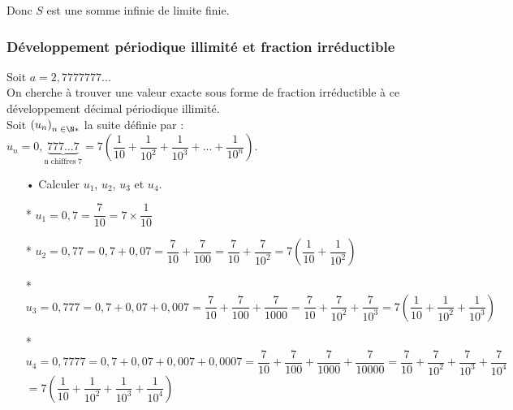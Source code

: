 Donc $S$ est une somme infinie de limite finie.

\subsubsection{Développement périodique illimité et fraction irréductible}

Soit $a = 2,7777777...$ \\

On cherche à trouver une valeur exacte sous forme de fraction irréductible à ce développement décimal périodique illimité. \\

Soit $\left(u_n\right)_{n \; \in \N*}$ la suite définie par : $u_n = 0, \! \! \! \underbrace{777...7}_{\mathrm{n \; chiffres \; 7}} = 7 \left(\dfrac{1}{10} + \dfrac{1}{10^2} + \dfrac{1}{10^3} + ... + \dfrac{1}{10^n}\right)$. \\

\begin{itemize}
\item[•] Calculer $u_1$, $u_2$, $u_3$ et $u_4$. \\
\end{itemize} 

\begin{itemize}
\item[*] $u_1 = 0,7 = \dfrac{7}{10} = 7 \times \dfrac{1}{10}$ \vspace*{.3cm} \\
\item[*] $u_2 = 0,77 = 0,7 + 0,07 = \dfrac{7}{10} + \dfrac{7}{100} = \dfrac{7}{10} + \dfrac{7}{10^2} = 7 \left(\dfrac{1}{10} + \dfrac{1}{10^2}\right)$ \vspace*{.3cm} \\
\item[*] $u_3 = 0,777 = 0,7 + 0,07 + 0,007 = \dfrac{7}{10} + \dfrac{7}{100} + \dfrac{7}{1000} = \dfrac{7}{10} + \dfrac{7}{10^2} + \dfrac{7}{10^3} = 7 \left(\dfrac{1}{10} + \dfrac{1}{10^2} + \dfrac{1}{10^3}\right)$ \vspace*{.3cm} \\
\item[*] $u_4 = 0,7777 = 0,7 + 0,07 + 0,007 + 0,0007 = \dfrac{7}{10} + \dfrac{7}{100} + \dfrac{7}{1000} + \dfrac{7}{10000} = \dfrac{7}{10} + \dfrac{7}{10^2} + \dfrac{7}{10^3} + \dfrac{7}{10^4}$ \\ \hspace*{.45cm}$ = 7 \left(\dfrac{1}{10} + \dfrac{1}{10^2} + \dfrac{1}{10^3} + \dfrac{1}{10^4}\right)$ \\
\end{itemize}


